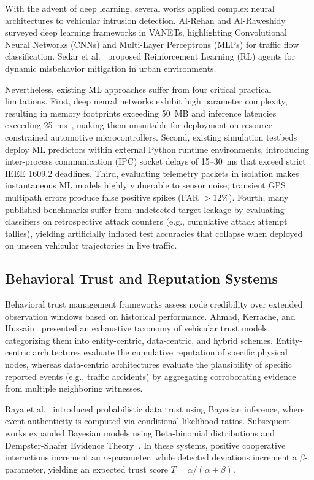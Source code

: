\documentclass[conference]{IEEEtran}
\begin{document}
With the advent of deep learning, several works applied complex neural architectures to vehicular intrusion detection. Al-Rehan and Al-Raweshidy~\cite{alrehan2019machine} surveyed deep learning frameworks in VANETs, highlighting Convolutional Neural Networks (CNNs) and Multi-Layer Perceptrons (MLPs) for traffic flow classification. Sedar et al.~\cite{sedar2020reinforcement} proposed Reinforcement Learning (RL) agents for dynamic misbehavior mitigation in urban environments. 

Nevertheless, existing ML approaches suffer from four critical practical limitations. First, deep neural networks exhibit high parameter complexity, resulting in memory footprints exceeding 50~MB and inference latencies exceeding 25~ms~\cite{alrehan2019machine}, making them unsuitable for deployment on resource-constrained automotive microcontrollers. Second, existing simulation testbeds deploy ML predictors within external Python runtime environments, introducing inter-process communication (IPC) socket delays of 15--30~ms that exceed strict IEEE 1609.2 deadlines. Third, evaluating telemetry packets in isolation makes instantaneous ML models highly vulnerable to sensor noise; transient GPS multipath errors produce false positive spikes (FAR $> 12\%$). Fourth, many published benchmarks suffer from undetected target leakage by evaluating classifiers on retrospective attack counters (e.g., cumulative attack attempt tallies), yielding artificially inflated test accuracies that collapse when deployed on unseen vehicular trajectories in live traffic.

\subsection{Behavioral Trust and Reputation Systems}

Behavioral trust management frameworks assess node credibility over extended observation windows based on historical performance. Ahmad, Kerrache, and Hussain~\cite{trustsurvey} presented an exhaustive taxonomy of vehicular trust models, categorizing them into entity-centric, data-centric, and hybrid schemes. Entity-centric architectures evaluate the cumulative reputation of specific physical nodes, whereas data-centric architectures evaluate the plausibility of specific reported events (e.g., traffic accidents) by aggregating corroborating evidence from multiple neighboring witnesses.

Raya et al.~\cite{raya} introduced probabilistic data trust using Bayesian inference, where event authenticity is computed via conditional likelihood ratios. Subsequent works expanded Bayesian models using Beta-binomial distributions and Dempster-Shafer Evidence Theory~\cite{ahmad2019trust}. In these systems, positive cooperative interactions increment an $\alpha$-parameter, while detected deviations increment a $\beta$-parameter, yielding an expected trust score $T = \alpha / (\alpha + \beta)$.
\end{document}
